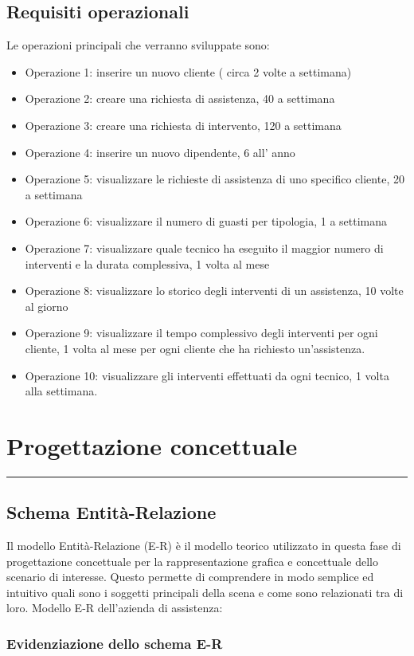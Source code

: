 \documentclass[legalpaper]{article}
\begin{document}
\subsection{Requisiti operazionali}
Le operazioni principali che verranno sviluppate sono:
\begin{itemize}
    \item Operazione 1: inserire un nuovo cliente ( circa 2 volte a settimana)
    \item Operazione 2: creare una richiesta di assistenza, 40 a settimana
    \item Operazione 3: creare una richiesta di intervento, 120 a settimana
    \item Operazione 4: inserire un nuovo dipendente, 6 all' anno
    \item Operazione 5: visualizzare le richieste di assistenza di uno specifico cliente, 20 a settimana
    \item Operazione 6: visualizzare il numero di guasti per tipologia, 1 a settimana
    \item Operazione 7: visualizzare quale tecnico ha eseguito il maggior numero di interventi e la durata complessiva, 1 volta al mese
    \item Operazione 8: visualizzare lo storico degli interventi di un assistenza, 10 volte al giorno
    \item Operazione 9: visualizzare il tempo complessivo degli interventi per ogni cliente, 1 volta al mese per ogni cliente che ha richiesto un'assistenza.
    \item Operazione 10: visualizzare gli interventi effettuati da ogni tecnico, 1 volta alla settimana.
\end{itemize}


\newpage
\section{Progettazione concettuale}
\rule{\linewidth}{1.5pt}
\subsection{Schema Entità-Relazione}
Il modello Entità-Relazione (E-R) è il modello teorico utilizzato in questa fase di progettazione concettuale per la rappresentazione grafica e concettuale dello scenario di interesse. Questo permette di comprendere in modo semplice ed intuitivo quali sono i soggetti principali della scena e come sono relazionati tra di loro. 
Modello E-R dell'azienda di assistenza:
\subsubsection{Evidenziazione dello schema E-R}
\end{document}
